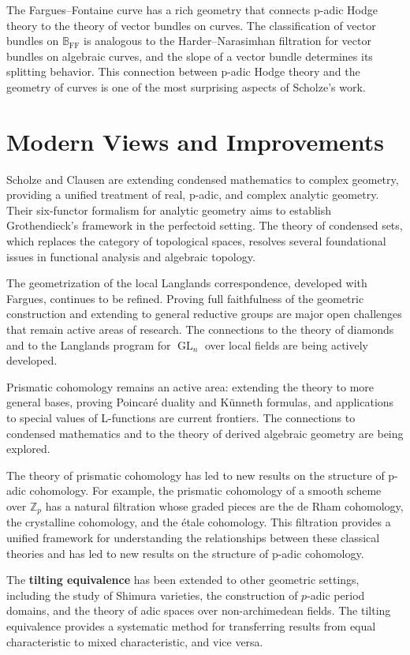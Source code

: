 The Fargues--Fontaine curve has a rich geometry that connects p-adic Hodge theory to the theory of vector bundles on curves. The classification of vector bundles on $\mathbb{B}_{\mathrm{FF}}$ is analogous to the Harder--Narasimhan filtration for vector bundles on algebraic curves, and the slope of a vector bundle determines its splitting behavior. This connection between p-adic Hodge theory and the geometry of curves is one of the most surprising aspects of Scholze's work.

\section{Modern Views and Improvements}

Scholze and Clausen are extending condensed mathematics to complex geometry, providing a unified treatment of real, p-adic, and complex analytic geometry. Their six-functor formalism for analytic geometry aims to establish Grothendieck's framework in the perfectoid setting. The theory of condensed sets, which replaces the category of topological spaces, resolves several foundational issues in functional analysis and algebraic topology.

The geometrization of the local Langlands correspondence, developed with Fargues, continues to be refined. Proving full faithfulness of the geometric construction and extending to general reductive groups are major open challenges that remain active areas of research. The connections to the theory of diamonds and to the Langlands program for $\operatorname{GL}_n$ over local fields are being actively developed.

Prismatic cohomology remains an active area: extending the theory to more general bases, proving Poincar\'e duality and K\"unneth formulas, and applications to special values of L-functions are current frontiers. The connections to condensed mathematics and to the theory of derived algebraic geometry are being explored.

The theory of prismatic cohomology has led to new results on the structure of p-adic cohomology. For example, the prismatic cohomology of a smooth scheme over $\mathbb{Z}_p$ has a natural filtration whose graded pieces are the de Rham cohomology, the crystalline cohomology, and the \'{e}tale cohomology. This filtration provides a unified framework for understanding the relationships between these classical theories and has led to new results on the structure of p-adic cohomology.

The \textbf{tilting equivalence} has been extended to other geometric settings, including the study of Shimura varieties, the construction of $p$-adic period domains, and the theory of adic spaces over non-archimedean fields. The tilting equivalence provides a systematic method for transferring results from equal characteristic to mixed characteristic, and vice versa.

